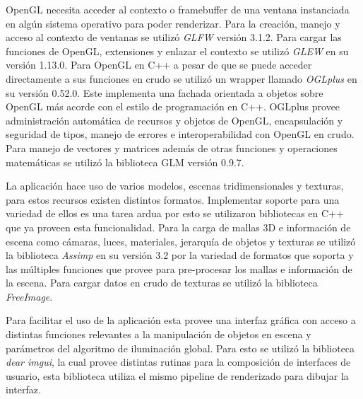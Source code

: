 OpenGL necesita acceder al contexto o framebuffer de una ventana instanciada en algún sistema operativo para poder renderizar. Para la creación, manejo y acceso al contexto de ventanas se utilizó \emph{GLFW} versión 3.1.2. Para cargar las funciones de OpenGL, extensiones y enlazar el contexto se utilizó \emph{GLEW} en su versión 1.13.0. Para OpenGL en C++ a pesar de que se puede acceder directamente a sus funciones en crudo se utilizó un wrapper llamado \emph{OGLplus} en su versión 0.52.0. Este implementa una fachada orientada a objetos sobre OpenGL más acorde con el estilo de programación en C++. OGLplus provee administración automática de recursos y objetos de OpenGL, encapsulación y seguridad de tipos, manejo de errores e interoperabilidad con OpenGL en crudo. Para manejo de vectores y matrices además de otras funciones y operaciones matemáticas se utilizó la biblioteca GLM versión 0.9.7.

La aplicación hace uso de varios modelos, escenas tridimensionales y texturas, para estos recursos existen distintos formatos. Implementar soporte para una variedad de ellos es una tarea ardua por esto se utilizaron bibliotecas en C++ que ya proveen esta funcionalidad. Para la carga de mallas 3D e información de escena como cámaras, luces, materiales, jerarquía de objetos y texturas se utilizó la biblioteca \emph{Assimp} en su versión 3.2 por la variedad de formatos que soporta y las múltiples funciones que provee para pre-procesar los mallas e información de la escena. Para cargar datos en crudo de texturas se utilizó la biblioteca \emph{FreeImage}.

Para facilitar el uso de la aplicación esta provee una interfaz gráfica con acceso a distintas funciones relevantes a la manipulación de objetos en escena y parámetros del algoritmo de iluminación global. Para esto se utilizó la biblioteca \emph{dear imgui}, la cual provee distintas rutinas para la composición de interfaces de usuario, esta biblioteca utiliza el mismo pipeline de renderizado para dibujar la interfaz.
